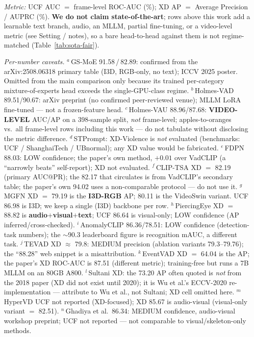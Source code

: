 \begin{table}[t]
\vspace{2pt}
\footnotesize
\begin{flushleft}
\textit{Metric:} UCF AUC $=$ frame-level ROC-AUC (\%); XD AP $=$ Average
Precision / AUPRC (\%). \textbf{We do not claim state-of-the-art}; rows above
this work add a learnable text branch, audio, an MLLM, partial fine-tuning, or
a video-level metric (see Setting / notes), so a bare head-to-head against them
is not regime-matched (Table~\ref{tab:sota-fair}).\par\smallskip
\textit{Per-number caveats.}
$^{a}$\,GS-MoE 91.58\,/\,82.89: confirmed from the arXiv:2508.06318 primary table
(I3D, RGB-only, no text); ICCV 2025 poster. Omitted from the main comparison only
because its trained per-category mixture-of-experts head exceeds the single-GPU-class regime.
$^{b}$\,Holmes-VAD 89.51/90.67: arXiv preprint (no confirmed peer-reviewed venue);
MLLM LoRA fine-tuned --- not a frozen-feature head.
$^{c}$\,Holmes-VAU 88.96/87.68: \textbf{VIDEO-LEVEL} AUC/AP on a 398-sample split,
\emph{not} frame-level; apples-to-oranges vs.\ all frame-level rows including this
work --- do not tabulate without disclosing the metric difference.
$^{d}$\,STPrompt: XD-Violence is \emph{not} evaluated (benchmarks: UCF /
ShanghaiTech / UBnormal); any XD value would be fabricated.
$^{e}$\,FDPN 88.03: LOW confidence; the paper's own method, $+0.01$ over VadCLIP
(a ``narrowly beats'' self-report); XD not evaluated.
$^{f}$\,CLIP-TSA XD $=$ 82.19 (primary AUC@PR); the 82.17 that circulates is from
VadCLIP's secondary table; the paper's own 94.02 uses a non-comparable protocol
--- do not use it.
$^{g}$\,MGFN XD $=$ 79.19 is the \textbf{I3D-RGB} AP; 80.11 is the VideoSwin
variant. UCF 86.98 is I3D; we keep a single (I3D) backbone per row.
$^{h}$\,PiercingEye XD $=$ 88.82 is \textbf{audio$+$visual$+$text}; UCF 86.64 is
visual-only; LOW confidence (AP inferred/cross-checked).
$^{i}$\,AnomalyCLIP 86.36/78.51: LOW confidence (detection-task numbers); the
$\sim$90.3 leaderboard figure is recognition mAUC, a different task.
$^{j}$\,TEVAD XD $\approx$ 79.8: MEDIUM precision (ablation variants 79.3--79.76);
the ``88.28'' web snippet is a misattribution.
$^{k}$\,EventVAD XD $=$ 64.04 is the AP; the paper's XD ROC-AUC is 87.51 (different
metric); training-free but runs a 7B MLLM on an 80GB A800.
$^{l}$\,Sultani XD: the 73.20 AP often quoted is \emph{not} from the 2018 paper
(XD did not exist until 2020); it is Wu et al.'s ECCV-2020 re-implementation ---
attribute to Wu et al., not Sultani; XD cell omitted here.
$^{m}$\,HyperVD UCF not reported (XD-focused); XD 85.67 is audio-visual
(visual-only variant $=$ 82.51).
$^{n}$\,Ghadiya et al.\ 86.34: MEDIUM confidence, audio-visual workshop preprint;
UCF not reported --- not comparable to visual/skeleton-only methods.
\end{flushleft}
\end{table}

